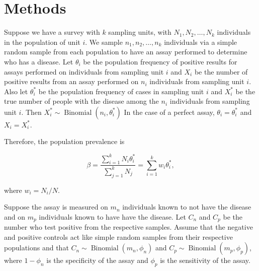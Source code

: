\documentclass[AMA,STIX1COL]{WileyNJD-v2}
\begin{document}
\section{Methods}
Suppose we have a survey with  \( k \) sampling units, with \( N_1, N_2, \ldots, N_k \) individuals in the population of unit \( i \).
We sample \( n_1, n_2, \ldots, n_k \) individuals via a simple random sample from each population to have an assay performed to determine who has a disease.
Let \( \theta_i \) be the population frequency of positive results for assays performed on individuals from sampling unit \( i \) and \( X_i \) be the number of positive results from an assay performed on \( n_i \) individuals from sampling unit \( i \).
Also let \( \theta_i^* \) be the population frequency of cases in sampling unit \( i \) and \( X_i^* \) be the true number of people with the disease among the \( n_i \) individuals from sampling unit \( i \).
Then \( X_i^* \sim \operatorname{Binomial}(n_i, \theta_i^*) \)
In the case of a perfect assay, \( \theta_i = \theta_i^* \) and \( X_i = X_i^* \).

Therefore, the population prevalence is 

\begin{equation}
    \beta = \frac{\sum_{i=1}^k N_i \theta_i^*}{\sum_{j=1}^k N_j} = \sum_{i=1}^k w_i \theta_i^*,
\end{equation}

where \( w_i = N_i / N \).

Suppose the assay is measured on \( m_n \) individuals known to not have the disease and on \( m_p \) individuals known to have have the disease.
Let \( C_n \) and \( C_p \) be the number who test positive from the respective samples.
Assume that the negative and positive controls act like simple random samples from their respective populations and that \( C_n \sim \operatorname{Binomial}(m_n, \phi_n) \) and \( C_p \sim \operatorname{Binomial}(m_p, \phi_p) \), where \( 1 - \phi_n \) is the specificity of the assay and \( \phi_p \) is the sensitivity of the assay.
\end{document}
